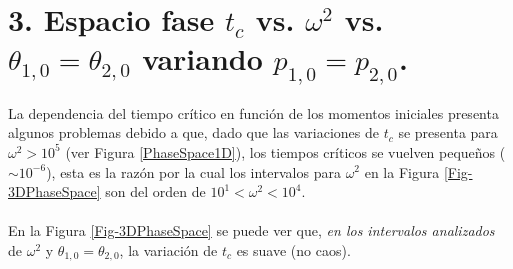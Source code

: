 \documentclass[10pt,letterpaper]{article}
\begin{document}
\section*{3. Espacio fase $t_c$ vs. $\omega^2$ vs. $\theta_{1,0} = \theta_{2,0}$ variando $p_{1,0} = p_{2,0}$.} 
La dependencia del tiempo crítico en función de los momentos iniciales presenta algunos problemas debido a que, dado que las variaciones de $t_c$ se presenta para $\omega^2 > 10^5 $ (ver Figura \ref{PhaseSpace1D}), los tiempos críticos se vuelven pequeños ($\sim 10^{-6}$), esta es la razón por la cual los intervalos para $\omega^2$ en la Figura \ref{Fig-3DPhaseSpace} son del orden de $10^1 < \omega^2 < 10^4$. 
\\
\\
En la Figura \ref{Fig-3DPhaseSpace} se puede ver que, \textit{en los intervalos analizados} de $\omega^2$ y $\theta_{1,0} = \theta_{2,0}$, la variación de $t_c$ es suave (no caos). 
\end{document}

